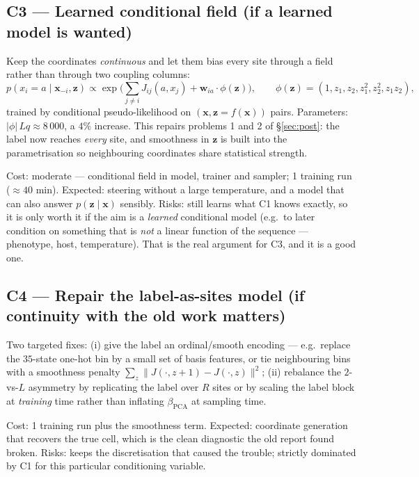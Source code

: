 \documentclass[10pt,a4paper]{article}
\newcommand{\cost}[1]{\textsf{\footnotesize #1}}
\newcommand{\PCA}{\mathrm{PCA}}
\begin{document}
\subsection*{C3 --- Learned conditional field (if a learned model is wanted)}
Keep the coordinates \emph{continuous} and let them bias every site through a field rather than
through two coupling columns:
\begin{equation}
p(x_i=a\mid\bm x_{-i},\bm z)\propto\exp\Big(\sum_{j\neq i}J_{ij}(a,x_j)+\bm w_{ia}\!\cdot\!\phi(\bm z)\Big),
\qquad \phi(\bm z)=(1,z_1,z_2,z_1^2,z_2^2,z_1z_2),
\end{equation}
trained by conditional pseudo-likelihood on $(\bm x,\bm z=f(\bm x))$ pairs. Parameters:
$|\phi|\,Lq\approx8\,000$, a $4\%$ increase. This repairs problems 1 and 2 of \S\ref{sec:post}:
the label now reaches \emph{every} site, and smoothness in $\bm z$ is built into the
parametrisation so neighbouring coordinates share statistical strength.

\noindent\cost{Cost:} moderate --- conditional field in model, trainer and sampler; 1 training run
($\approx40$ min). \cost{Expected:} steering without a large temperature, and a model that can also
answer $p(\bm z\mid\bm x)$ sensibly. \cost{Risks:} still learns what C1 knows exactly, so it is
only worth it if the aim is a \emph{learned} conditional model (e.g.\ to later condition on
something that is \emph{not} a linear function of the sequence --- phenotype, host, temperature).
That is the real argument for C3, and it is a good one.

\subsection*{C4 --- Repair the label-as-sites model (if continuity with the old work matters)}
Two targeted fixes: (i) give the label an ordinal/smooth encoding --- e.g.\ replace the $35$-state
one-hot bin by a small set of basis features, or tie neighbouring bins with a smoothness penalty
$\sum_z\|J(\cdot,z{+}1)-J(\cdot,z)\|^2$; (ii) rebalance the $2$-vs-$L$ asymmetry by replicating the
label over $R$ sites or by scaling the label block at \emph{training} time rather than inflating
$\beta_{\PCA}$ at sampling time.

\noindent\cost{Cost:} 1 training run plus the smoothness term. \cost{Expected:} coordinate
generation that recovers the true cell, which is the clean diagnostic the old report found broken.
\cost{Risks:} keeps the discretisation that caused the trouble; strictly dominated by C1 for this
particular conditioning variable.
\end{document}
